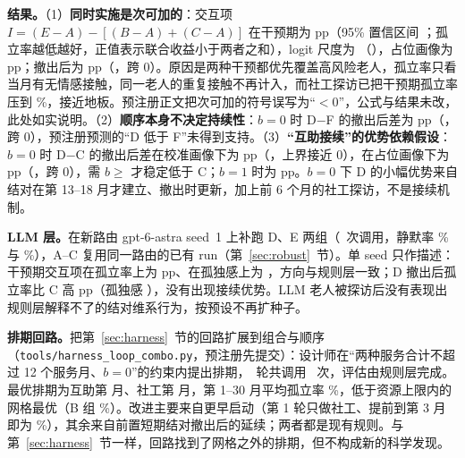 \documentclass[10.5pt,twocolumn]{ctexart}
\begin{document}
\textbf{结果。}（1）\textbf{同时实施是次可加的}：交互项 $I=(E-A)-[(B-A)+(C-A)]$ 在干预期为 \CbIntIv{} pp（95\% 置信区间 \CbIntIvCI；孤立率越低越好，正值表示联合收益小于两者之和），logit 尺度为 \CbIntIvLogit（\CbIntIvLogitCI），占位画像为 \CbIntIvPh{} pp；撤出后为 \CbIntPost{} pp（\CbIntPostCI，跨 0）。原因是两种干预都优先覆盖高风险老人，孤立率只看当月有无情感接触，同一老人的重复接触不再计入，而社工探访已把干预期孤立率压到 \CbIvB\%，接近地板。预注册正文把次可加的符号误写为``$<0$''，公式与结果未改，此处如实说明。（2）\textbf{顺序本身不决定持续性}：$b=0$ 时 D$-$F 的撤出后差为 \CbDF{} pp（\CbDFCI，跨 0），预注册预测的``D 低于 F''未得到支持。（3）\textbf{``互助接续''的优势依赖假设}：$b=0$ 时 D$-$C 的撤出后差在校准画像下为 \CbDCZero{} pp（\CbDCZeroCI，上界接近 0），在占位画像下为 \CbDCZeroPh{} pp（\CbDCZeroPhCI，跨 0），需 $b\ge$\CbThreshPh{} 才稳定低于 C；$b=1$ 时为 \CbDCOne{} pp。$b=0$ 下 D 的小幅优势来自结对在第 13--18 月才建立、撤出时更新，加上前 6 个月的社工探访，不是接续机制。

\textbf{LLM 层。}在新路由 gpt-6-astra seed~1 上补跑 D、E 两组（\CallsAstraCombo\ 次调用，静默率 \CbLlmSilD\% 与 \CbLlmSilE\%），A--C 复用同一路由的已有 run（第~\ref{sec:robust}~节）。单 seed 只作描述：干预期交互项在孤立率上为 \CbLlmIntIv{} pp、在孤独感上为 \CbLlmIntLonIv，方向与规则层一致；D 撤出后孤立率比 C 高 \CbLlmDCPost{} pp（孤独感 \CbLlmDCLonPost），没有出现接续优势。LLM 老人被探访后没有表现出规则层解释不了的结对维系行为，按预设不再扩种子。

\textbf{排期回路。}把第~\ref{sec:harness}~节的回路扩展到组合与顺序（\texttt{tools/harness\_loop\_combo.py}，预注册先提交）：设计师在``两种服务合计不超过 12 个服务月、$b=0$''的约束内提出排期，\CbHlRounds\ 轮共调用 \CallsHarnessCombo\ 次，评估由规则层完成。最优排期为互助第 \CbHlBestTb{} 月、社工第 \CbHlBestCw{} 月，第 1--30 月平均孤立率 \CbHlBest\%，低于资源上限内的网格最优（B 组 \CbHlGridBest\%）。改进主要来自更早启动（第 1 轮只做社工、提前到第 3 月即为 \CbHlFirst\%），其余来自前置短期结对撤出后的延续；两者都是现有规则。与第~\ref{sec:harness}~节一样，回路找到了网格之外的排期，但不构成新的科学发现。
\end{document}
